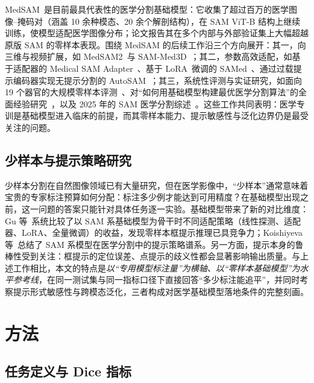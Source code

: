 \documentclass[zihao=-4,a4paper]{ctexart}
\begin{document}
MedSAM~\cite{ma2024segment}是目前最具代表性的医学分割基础模型：它收集了超过百万的医学图像--掩码对（涵盖 10 余种模态、20 余个解剖结构），在 SAM ViT-B 结构上继续训练，使模型适配医学图像分布；论文报告其在多个内部与外部验证集上大幅超越原版 SAM 的零样本表现。围绕 MedSAM 的后续工作沿三个方向展开：其一，向三维与视频扩展，如 MedSAM2~\cite{ma2025medsam2}与 SAM-Med3D~\cite{wang2023sammed3d}；其二，参数高效适配，如基于适配器的 Medical SAM Adapter~\cite{wu2023medsamadapter}、基于 LoRA~\cite{hu2022lora}微调的 SAMed~\cite{zhang2023samed}、通过过载提示编码器实现无提示分割的 AutoSAM~\cite{shaharabany2023autosam}；其三，系统性评测与实证研究，如面向 19 个器官的大规模零样本评测~\cite{huang2024sam}、对``如何用基础模型构建最优医学分割算法''的全面经验研究~\cite{gu2025how}，以及 2025 年的 SAM 医学分割综述~\cite{koishiyeva2025review}。这些工作共同表明：医学专训是基础模型进入临床的前提，而其零样本能力、提示敏感性与泛化边界仍是最受关注的问题。

\subsection{少样本与提示策略研究}

少样本分割在自然图像领域已有大量研究，但在医学影像中，``少样本''通常意味着宝贵的专家标注预算如何分配：标注多少例才能达到可用精度？在基础模型出现之前，这一问题的答案只能针对具体任务逐一实验。基础模型带来了新的对比维度：Gu 等~\cite{gu2025how}系统比较了以 SAM 系基础模型为骨干时不同适配策略（线性探测、适配器、LoRA、全量微调）的收益，发现零样本框提示推理已具竞争力；Koishiyeva 等~\cite{koishiyeva2025review}总结了 SAM 系模型在医学分割中的提示策略谱系。另一方面，提示本身的鲁棒性受到关注：框提示的定位误差、点提示的歧义性都会显著影响输出质量。与上述工作相比，本文的特点是\emph{以``专用模型标注量''为横轴、以``零样本基础模型''为水平参考线}，在同一测试集与同一指标口径下直接回答``多少标注能追平''，并同时考察提示形式敏感性与跨模态泛化，三者构成对医学基础模型落地条件的完整刻画。

\section{方法}

\subsection{任务定义与 Dice 指标}
\end{document}
